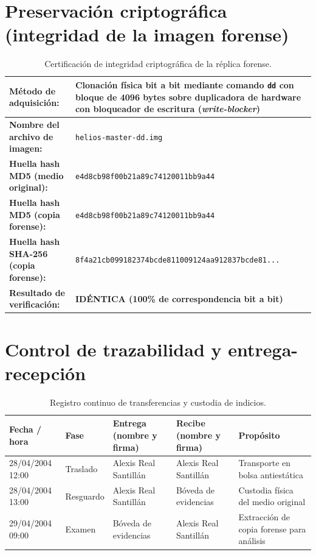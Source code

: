 \section{Preservación criptográfica (integridad de la imagen forense)}

\begin{table}[htbp]
\centering
\small
\begin{tabularx}{\textwidth}{|l|X|}
\hline
\textbf{Método de adquisición:} & Clonación física bit a bit mediante comando \texttt{dd} con bloque de 4096 bytes sobre duplicadora de hardware con bloqueador de escritura (\textit{write-blocker}) \\ \hline
\textbf{Nombre del archivo de imagen:} & \texttt{helios-master-dd.img} \\ \hline
\textbf{Huella hash MD5 (medio original):} & \texttt{e4d8cb98f00b21a89c74120011bb9a44} \\ \hline
\textbf{Huella hash MD5 (copia forense):} & \texttt{e4d8cb98f00b21a89c74120011bb9a44} \\ \hline
\textbf{Huella hash SHA-256 (copia forense):} & \texttt{8f4a21cb099182374bcde811009124aa912837bcde81...} \\ \hline
\textbf{Resultado de verificación:} & \textbf{IDÉNTICA (100\% de correspondencia bit a bit)} \\ \hline
\end{tabularx}
\caption{Certificación de integridad criptográfica de la réplica forense.}
\end{table}

\section{Control de trazabilidad y entrega-recepción}

\begin{table}[htbp]
\centering
\scriptsize
\begin{tabularx}{\textwidth}{|l|l|X|X|p{2.2cm}|}
\hline
\textbf{Fecha / hora} & \textbf{Fase} & \textbf{Entrega (nombre y firma)} & \textbf{Recibe (nombre y firma)} & \textbf{Propósito} \\ \hline
28/04/2004 12:00 & Traslado & Alexis Real Santillán & Alexis Real Santillán & Transporte en bolsa antiestática \\ \hline
28/04/2004 13:00 & Resguardo & Alexis Real Santillán & Bóveda de evidencias & Custodia física del medio original \\ \hline
29/04/2004 09:00 & Examen & Bóveda de evidencias & Alexis Real Santillán & Extracción de copia forense para análisis \\ \hline
\end{tabularx}
\caption{Registro continuo de transferencias y custodia de indicios.}
\end{table}
